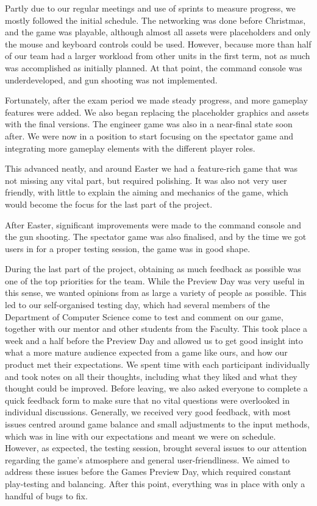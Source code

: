 \documentclass[a4paper,11pt]{article}
\begin{document}
Partly due to our regular meetings and use of sprints to measure progress, we mostly followed the initial schedule. The networking was done before Christmas, and the game was playable, although almost all assets were placeholders and only the mouse and keyboard controls could be used. However, because more than half of our team had a larger workload from other units in the first term, not as much was accomplished as initially planned. At that point, the command console was underdeveloped, and gun shooting was not implemented.

Fortunately, after the exam period we made steady progress, and more gameplay features were added. We also began replacing the placeholder graphics and assets with the final versions. The engineer game was also in a near-final state soon after. We were now in a position to start focusing on the spectator game and integrating more gameplay elements with the different player roles.

This advanced neatly, and around Easter we had a feature-rich game that was not missing any vital part, but required polishing. It was also not very user friendly, with little to explain the aiming and mechanics of the game, which would become the focus for the last part of the project.

After Easter, significant improvements were made to the command console and the gun shooting. The spectator game was also finalised, and by the time we got users in for a proper testing session, the game was in good shape.

During the last part of the project, obtaining as much feedback as possible was one of the top priorities for the team. While the Preview Day was very useful in this sense, we wanted opinions from as large a variety of people as possible. This led to our self-organised testing day, which had several members of the Department of Computer Science come to test and comment on our game, together with our mentor and other students from the Faculty. This took place a week and a half before the Preview Day and allowed us to get good insight into what a more mature audience expected from a game like ours, and how our product met their expectations. We spent time with each participant individually and took notes on all their thoughts, including what they liked and what they thought could be improved. Before leaving, we also asked everyone to complete a quick feedback form to make sure that no vital questions were overlooked in individual discussions. Generally, we received very good feedback, with most issues centred around game balance and small adjustments to the input methods, which was in line with our expectations and meant we were on schedule.
However, as expected, the testing session, brought several issues to our attention regarding the game’s atmosphere and general user-friendliness. We aimed to address these issues before the Games Preview Day, which required constant play-testing and balancing. After this point, everything was in place with only a handful of bugs to fix.
\end{document}
